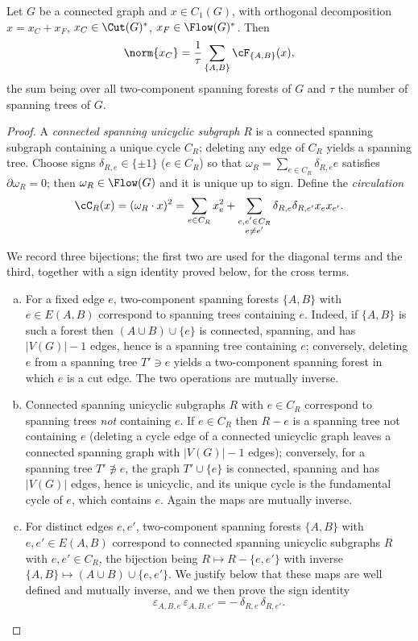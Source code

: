\begin{lem}
\label{lem:length}
Let $G$ be a connected graph and $x\in C_1(G)$, with orthogonal decomposition
$x=x_C+x_F$, $x_C\in\Cut(G)^\ast$, $x_F\in\Flow(G)^\ast$.  Then
\[
\norm{x_C}=\frac1\tau\sum_{\{A,B\}}\cF_{\{A,B\}}(x),
\]
the sum being over all two-component spanning forests of $G$ and $\tau$ the number of
spanning trees of $G$.
\end{lem}

\begin{proof}
A \emph{connected spanning unicyclic subgraph} $R$ is a connected spanning subgraph
containing a unique cycle $C_R$; deleting any edge of $C_R$ yields a spanning tree.  Choose
signs $\delta_{R,e}\in\{\pm1\}$ ($e\in C_R$) so that
$\omega_R=\sum_{e\in C_R}\delta_{R,e}e$ satisfies $\partial\omega_R=0$; then
$\omega_R\in\Flow(G)$ and it is unique up to sign.  Define the \emph{circulation}
\begin{equation}
\label{eq:circ}
\cC_R(x)=(\omega_R\cdot x)^2
=\sum_{e\in C_R}x_e^2+\sum_{\substack{e,e'\in C_R\\ e\ne e'}}\delta_{R,e}\delta_{R,e'}x_ex_{e'} .
\end{equation}

We record three bijections; the first two are used for the diagonal terms and the
third, together with a sign identity proved below, for the cross terms.
\begin{enumerate}[(a)]
\item For a fixed edge $e$, two-component spanning forests $\{A,B\}$ with $e\in E(A,B)$
correspond to spanning trees containing $e$.  Indeed, if $\{A,B\}$ is such a forest then
$(A\cup B)\cup\{e\}$ is connected, spanning, and has $|V(G)|-1$ edges, hence is a spanning
tree containing $e$; conversely, deleting $e$ from a spanning tree $T'\ni e$ yields a
two-component spanning forest in which $e$ is a cut edge.  The two operations are mutually
inverse.
\item Connected spanning unicyclic subgraphs $R$ with $e\in C_R$ correspond to spanning
trees \emph{not} containing $e$.  If $e\in C_R$ then $R-e$ is a spanning tree not containing
$e$ (deleting a cycle edge of a connected unicyclic graph leaves a connected spanning graph
with $|V(G)|-1$ edges); conversely, for a spanning tree $T'\not\ni e$, the graph
$T'\cup\{e\}$ is connected, spanning and has $|V(G)|$ edges, hence is unicyclic, and its
unique cycle is the fundamental cycle of $e$, which contains $e$.  Again the maps are
mutually inverse.
\item For distinct edges $e,e'$, two-component spanning forests $\{A,B\}$ with
$e,e'\in E(A,B)$ correspond to connected spanning unicyclic subgraphs $R$ with
$e,e'\in C_R$, the bijection being $R\mapsto R-\{e,e'\}$ with inverse
$\{A,B\}\mapsto (A\cup B)\cup\{e,e'\}$.  We justify below that these maps are well defined
and mutually inverse, and we then prove the sign identity
\begin{equation}
\label{eq:signid}
\varepsilon_{A,B,e}\,\varepsilon_{A,B,e'}=-\,\delta_{R,e}\,\delta_{R,e'}.
\end{equation}
\end{enumerate}


\end{proof}
